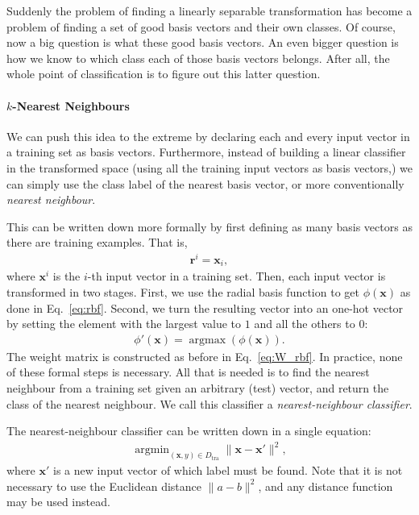 \documentclass{report}
\newcommand{\vect}[1]{\mathbf{#1}}
\newcommand{\vx}[0]{\vect{x}}
\newcommand{\vr}[0]{\vect{r}}
\DeclareMathOperator*{\argmax}{\arg \max}
\DeclareMathOperator*{\argmin}{\arg \min}
\begin{document}
Suddenly the problem of finding a linearly separable transformation has become a
problem of finding a set of good basis vectors and their own classes. Of course,
now a big question is what these good basis vectors. An even bigger question is
how we know to which class each of those basis vectors belongs. After all, the
whole point of classification is to figure out this latter question.

\paragraph{$k$-Nearest Neighbours}

We can push this idea to the extreme by declaring each and every input vector in
a training set as basis vectors. Furthermore, instead of building a linear
classifier in the transformed space (using all the training input vectors as
basis vectors,) we can simply use the class label of the nearest basis vector,
or more conventionally {\it nearest neighbour}. 

This can be written down more formally by first defining as many basis vectors
as there are training examples. That is,
\begin{align*}
    \vr^i = \vx_i,
\end{align*}
where $\vx^i$ is the $i$-th input vector in a training set. Then, each input
vector is transformed in two stages. First, we use the radial basis function to
get $\phi(\vx)$ as done in Eq.~\eqref{eq:rbf}. Second, we turn the resulting
vector into an one-hot vector by setting the element with the largest value to
$1$ and all the others to $0$:
\begin{align*}
    \phi'(\vx) = \argmax(\phi(\vx)).
\end{align*}
The weight matrix is constructed as before in Eq.~\eqref{eq:W_rbf}.  In
practice, none of these formal steps is necessary. All that is needed is to find
the nearest neighbour from a training set given an arbitrary (test) vector, and
return the class of the nearest neighbour. We call this classifier a {\it
nearest-neighbour classifier}.

The nearest-neighbour classifier can be written down in a single equation:
\begin{align*}
    \argmin_{(\vx, y) \in D_{\text{tra}}} \| \vx - \vx' \|^2,
\end{align*}
where $\vx'$ is a new input vector of which label must be found. Note that it is
not necessary to use the Euclidean distance $\| a - b \|^2$, and any distance
function may be used instead.
\end{document}
